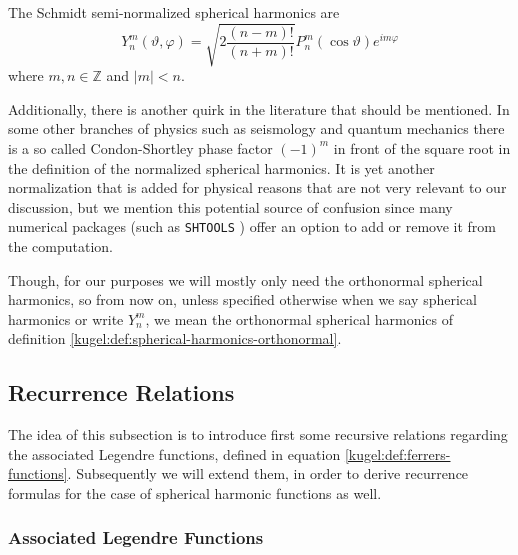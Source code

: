 \begin{definition}
  \label{kugel:def:spherical-harmonics-schmidt}
  The Schmidt semi-normalized spherical harmonics are
  \begin{equation*}
    Y^m_n(\vartheta, \varphi)
    = \sqrt{2 \frac{(n - m)!}{(n + m)!}}
      P^m_n(\cos \vartheta) e^{im\varphi}
  \end{equation*}
  where $m, n \in \mathbb{Z}$ and $|m| < n$.
\end{definition}

Additionally, there is another quirk in the literature that should be mentioned.
In some other branches of physics such as seismology and quantum mechanics there
is a so called Condon-Shortley phase factor $(-1)^m$ in front of the square root
in the definition of the normalized spherical harmonics. It is yet another
normalization that is added for physical reasons that are not very relevant to
our discussion, but we mention this potential source of confusion since many
numerical packages (such as \texttt{SHTOOLS}
\cite{markwieczorek_shtoolsshtools_2022}) offer an option to add or remove it
from the computation.

Though, for our purposes we will mostly only need the orthonormal spherical
harmonics, so from now on, unless specified otherwise when we say spherical
harmonics or write $Y^m_n$, we mean the orthonormal spherical harmonics of
definition \ref{kugel:def:spherical-harmonics-orthonormal}.

\subsection{Recurrence Relations}
\label{kugel:sec:construction:recurrence}

The idea of this subsection is to introduce first some recursive relations
regarding the associated Legendre functions, defined in equation
\eqref{kugel:def:ferrers-functions}. Subsequently we will extend them, in order
to derive recurrence formulas for the case of spherical harmonic functions as
well.

\subsubsection{Associated Legendre Functions}

